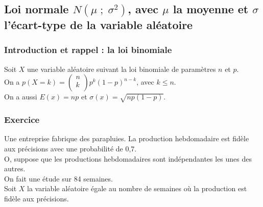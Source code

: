 \subsection{Loi normale $N\left(\mu \; ; \; \sigma^2\right)$, avec $\mu$ la moyenne et $\sigma$ l'écart-type de la variable aléatoire}

\subsubsection{Introduction et rappel : la loi binomiale}

Soit $X$ une variable aléatoire suivant la loi binomiale de paramètres $n$ et $p$. \\

On a $p\left(X = k\right) = \begin{pmatrix}
n \\
k \\
\end{pmatrix} p^k \left(1 - p\right)^{n-k}$, avec $k \leqslant n$. \\

On a aussi $E\left(x\right) = np$ et $\sigma\left(x\right) = \sqrt{np\left(1-p\right)}$.

\subsubsection{Exercice}

Une entreprise fabrique des parapluies. La production hebdomadaire est fidèle aux précisions avec une probabilité de 0,7. \\
O, suppose que les productions hebdomadaires sont indépendantes les unes des autres. \\
On fait une étude sur 84 semaines. \\
Soit $X$ la variable aléatoire égale au nombre de semaines où la production est fidèle aux précisions. \\

